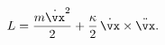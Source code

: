 \begin{equation}
     L=
     \frac{m\dot{\vx}^2}{2}
     +
     \frac{\kappa}{2}\,\dot{\vx}\times\ddot{\vx}.
     \label{LSZlag}
\end{equation}

